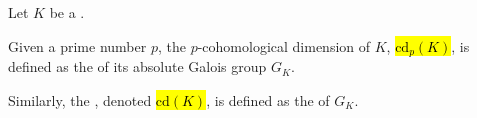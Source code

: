 \begin{definition}  \label{definition:p_cohomological_dimension_of_a_field}
    Let $K$ be a . 

    Given a prime number $p$, the $p$-cohomological dimension of $K$, \hl{$\text{cd}_p(K)$}, is defined as the  of its absolute Galois group $G_K$.
    
    Similarly, the , denoted \hl{$\text{cd}(K)$}, is defined as the  of $G_K$.
\end{definition}